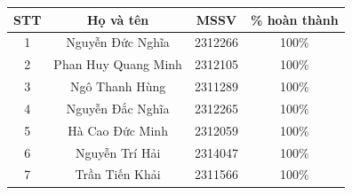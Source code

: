 \documentclass[a4paper, 15pt]{article}
\begin{document}


\begin{center}
\begin{table}[H]
\centering
\renewcommand{\arraystretch}{1.5}
\begin{tabular}{|c|c|c|c|}
\hline
\textbf{STT} & \textbf{Họ và tên} & \textbf{MSSV} & \textbf{\% hoàn thành}\\
\hline 
\multirow{1}{*}{1} & \multirow{1}{*}{Nguyễn Đức Nghĩa} & \multirow{1}{*}{2312266} & \multirow{1}{*}{100\%}\\
\hline 
\multirow{1}{*}{2} & \multirow{1}{*}{Phan Huy Quang Minh} & \multirow{1}{*}{2312105} & \multirow{1}{*}{100\%}\\

\hline
\multirow{1}{*}{3} & \multirow{1}{*}{Ngô Thanh Hùng} & \multirow{1}{*}{2311289} & \multirow{1}{*}{100\%}\\

\hline
\multirow{1}{*}{4} & \multirow{1}{*}{Nguyễn Đắc Nghĩa} & \multirow{1}{*}{2312265} & \multirow{1}{*}{100\%}\\
\hline
\multirow{1}{*}{5} & \multirow{1}{*}{Hà Cao Đức Minh} & \multirow{1}{*}{2312059} & \multirow{1}{*}{100\%}\\
\hline
\multirow{1}{*}{6} & \multirow{1}{*}{Nguyễn Trí Hải} & \multirow{1}{*}{2314047} & \multirow{1}{*}{100\%}\\
\hline
\multirow{1}{*}{7} & \multirow{1}{*}{Trần Tiến Khải} & \multirow{1}{*}{2311566} & \multirow{1}{*}{100\%}\\
\hline
\end{tabular}
\end{table}
\end{center}

\newpage






\end{document}
